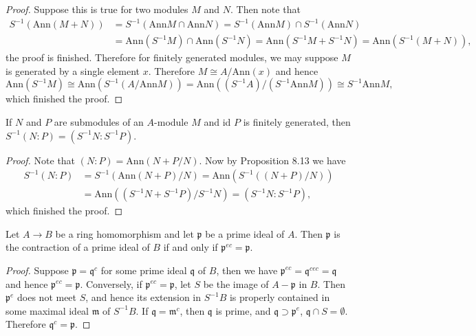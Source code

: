 \begin{proof}
Suppose this is true for two modules $M$ and $N$. Then note that 
$$
\begin{aligned}
S^{-1}\left( \mathrm{Ann}\left( M+N \right) \right) &=S^{-1}\left( \mathrm{Ann}M\cap \mathrm{Ann}N \right) =S^{-1}\left( \mathrm{Ann}M \right) \cap S^{-1}\left( \mathrm{Ann}N \right) 
\\
&=\mathrm{Ann}\left( S^{-1}M \right) \cap \mathrm{Ann}\left( S^{-1}N \right) =\mathrm{Ann}\left( S^{-1}M+S^{-1}N \right) =\mathrm{Ann}\left( S^{-1}\left( M+N \right) \right) ,
\end{aligned}
$$
the proof is finished. Therefore for finitely generated modules, we may suppose $M$ is generated by a single element $x$. Therefore $M\cong A/\mathrm{Ann}(x)$ and hence 
$$
\mathrm{Ann}\left( S^{-1}M \right) \cong \mathrm{Ann}\left( S^{-1}\left( A/\mathrm{Ann}M \right) \right) =\mathrm{Ann}\left( \left( S^{-1}A \right) /\left( S^{-1}\mathrm{Ann}M \right) \right) \cong S^{-1}\mathrm{Ann}M,
$$
which finished the proof.
\end{proof}
\begin{corollary}
If $N$ and $P$ are submodules of an $A$-module $M$ and id $P$ is finitely generated, then $S^{-1}(N:P)=(S^{-1}N:S^{-1}P)$.
\end{corollary}
\begin{proof}
Note that $(N:P)=\mathrm{Ann}(N+P/N)$. Now by Proposition 8.13 we have 
$$
\begin{aligned}
S^{-1}\left( N:P \right) &=S^{-1}\left( \mathrm{Ann}\left( N+P \right) /N \right) =\mathrm{Ann}\left( S^{-1}\left( \left( N+P \right) /N \right) \right) 
\\
&=\mathrm{Ann}\left( \left( S^{-1}N+S^{-1}P \right) /S^{-1}N \right) =\left( S^{-1}N:S^{-1}P \right) ,
\end{aligned}
$$
which finished the proof.
\end{proof}
\begin{proposition}
Let $A\to B$ be a ring homomorphism and let $\mathfrak{p}$ be a prime ideal of $A$. Then $\mathfrak{p}$ is the contraction of a prime ideal of $B$ if and only if $\mathfrak{p}^{ec}=\mathfrak{p}$.
\end{proposition}
\begin{proof}
Suppose $\mathfrak{p}=\mathfrak{q}^c$ for some prime ideal $\mathfrak{q}$ of $B$, then we have $\mathfrak{p}^{ec}=\mathfrak{q}^{cec}=\mathfrak{q}$ and hence $\mathfrak{p}^{ec}=\mathfrak{p}$. Conversely, if $\mathfrak{p}^{ec}=\mathfrak{p}$, let $S$ be the image of $A-\mathfrak{p}$ in $B$. Then $\mathfrak{p}^e$ does not meet $S$, and hence its extension in $S^{-1}B$ is properly contained in some maximal ideal $\mathfrak{m}$ of $S^{-1}B$. If $\mathfrak{q}=\mathfrak{m}^c$, then $\mathfrak{q}$ is prime, and $\mathfrak{q}\supset\mathfrak{p}^e$, $\mathfrak{q}\cap S=\emptyset$. Therefore $\mathfrak{q}^c=\mathfrak{p}$.
\end{proof}
